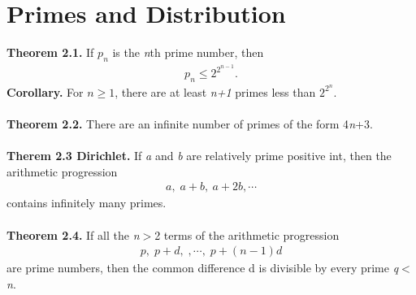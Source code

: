 \documentclass[a4paper,10pt]{article}
\begin{document}
\section{Primes and Distribution}
\textbf{Theorem 2.1.} If \textit{$p_n$} is the \textit{n}th prime number, then 
\begin{align}
p_n\leq 2^{2^{n-1}}.
\end{align}
\textbf{Corollary.} For \textit{$n\geq 1$}, there are at least \textit{n+1} primes less than $2^{2^{n}}$. \\ \\
\textbf{Theorem 2.2.} There are an infinite number of primes of the form 4\textit{n}+3. \\ \\
\textbf{Therem 2.3 Dirichlet.} If \textit{a} and \textit{b} are relatively prime positive int, then the arithmetic progression
\begin{align}
a, \; a+b, \: a+2b, \cdots
\end{align}
contains infinitely many primes. \\ \\
\textbf{Theorem 2.4.} If all the \textit{n}$>$2 terms of the arithmetic progression
\begin{align}
p, \; p+d,\; ,\cdots, \; p+(n-1)d
\end{align}
are prime numbers, then the common difference d is divisible by every prime \textit{q}$<$\textit{n}. \\ \\
\end{document}
